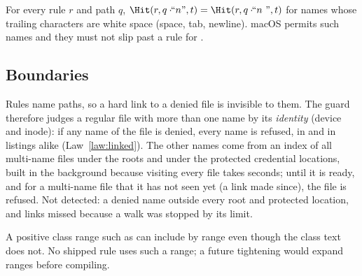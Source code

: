 \begin{law}
\label{law:tail}
For every rule $r$ and path $q$, $\Hit(r,q\cdot\!\!\text{``}n\text{''},t)=
\Hit(r,q\cdot\!\!\text{``}n\ \text{''},t)$ for names whose trailing characters
are white space (space, tab, newline).  macOS permits such names and they must
not slip past a rule for .
\end{law}

\subsection{Boundaries}

\begin{boundary}
Rules name paths, so a hard link to a denied file is invisible to them.  The guard
therefore judges a regular file with more than one name by its \emph{identity}
(device and inode): if any name of the file is denied, every name is refused, in
 and in listings alike (Law~\ref{law:linked}).  The other names come
from an index of all multi-name files under the roots and under the protected
credential locations, built in the background because visiting every file takes
seconds; until it is ready, and for a multi-name file that it has not seen yet
(a link made since), the file is refused.  Not detected: a denied name outside
every root and protected location, and links missed because a walk was stopped
by its limit.
\end{boundary}

\begin{boundary}
A positive class range such as \code{[+-0]} can include \code{/} by range even
though the class text does not.  No shipped rule uses such a range; a future
tightening would expand ranges before compiling.
\end{boundary}
